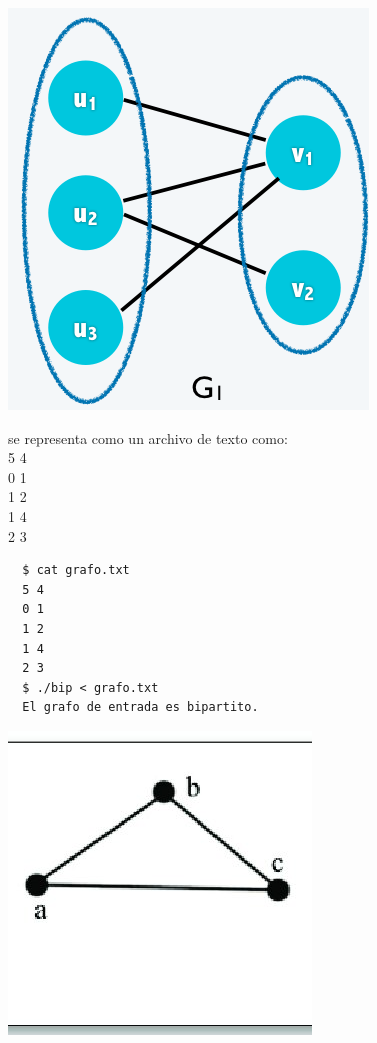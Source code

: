 \documentclass{article}
\begin{document}
\includegraphics[scale=0.3]{bip.png}

se representa como un archivo de texto como:\\
5 4\\
0 1\\
1 2\\
1 4\\
2 3\\

\begin{commandline}
\begin{verbatim}
  $ cat grafo.txt
  5 4
  0 1
  1 2
  1 4
  2 3
  $ ./bip < grafo.txt
  El grafo de entrada es bipartito.
\end{verbatim}
\end{commandline}
\newpage
\includegraphics[scale=0.9]{nobip.jpg}
\end{document}

